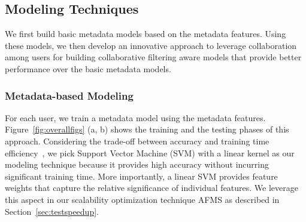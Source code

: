 
\subsection{Modeling Techniques} 
\label{sec:Metamodels}
We first build basic metadata models based on the metadata features.
Using these models, we then develop an innovative approach to leverage
collaboration among users for building collaborative filtering aware
models that provide better performance over the basic metadata models.

\subsubsection{Metadata-based Modeling}
For each user, we train a metadata model using the metadata features.
Figure~\ref{fig:overallfigs} (a, b) shows the training and the testing
phases of this approach.  Considering the trade-off between accuracy
and training time efficiency~\cite{dwiticeis15}, we pick Support
Vector Machine (SVM) with a linear kernel as our modeling technique
because it provides high accuracy without incurring significant
training time.  More importantly, a linear SVM provides feature
weights that capture the relative significance of individual features.
We leverage this aspect in our scalability optimization technique AFMS
as described in Section~\ref{sec:testspeedup}.

